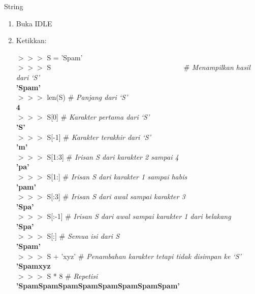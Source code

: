 \begin{panduan}{String}
\begin{enumerate}
	\item Buka IDLE
	\item Ketikkan:
	\begin{IDLE}
		\begin{tabbing}
		$>>>$ S = 'Spam' \\
		$>>>$ S ~~~~~~~~~~~~~~~~~~~~~~~~~~~~~~~~~~~~ \= \# \textit{Menampilkan hasil dari `S'}\\
		\textbf{'Spam'}\\
		$>>>$ len(S) \> \# \textit{Panjang dari `S'}\\
		\textbf{4}\\
		$>>>$ S[0] \> \# \textit{Karakter pertama dari `S'}\\
		\textbf{'S'}\\
		$>>>$ S[-1] \> \# \textit{Karakter terakhir dari `S'}\\
		\textbf{'m'}\\
		$>>>$ S[1:3] \> \# \textit{Irisan S dari karakter 2 sampai 4}\\
		\textbf{'pa'}\\
		$>>>$ S[1:] \> \# \textit{Irisan S dari karakter 1 sampai habis}\\
		\textbf{'pam'}\\
		$>>>$ S[:3] \> \# \textit{Irisan S dari awal sampai karakter 3}\\
		\textbf{'Spa'}\\
		$>>>$ S[:-1] \> \# \textit{Irisan S dari awal sampai karakter 1 dari belakang}\\
		\textbf{'Spa'}\\
		$>>>$ S[:] \> \# \textit{Semua isi dari S}\\
		\textbf{'Spam'}\\
		$>>>$ S + 'xyz' \> \# \textit{Penambahan karakter tetapi tidak disimpan ke `S'}\\
		\textbf{'Spamxyz}\\
		$>>>$ S * 8 \> \# \textit{Repetisi}\\
		\textbf{'SpamSpamSpamSpamSpamSpamSpamSpam'}
		\end{tabbing}
	\end{IDLE}	
\end{enumerate}
\end{panduan}

